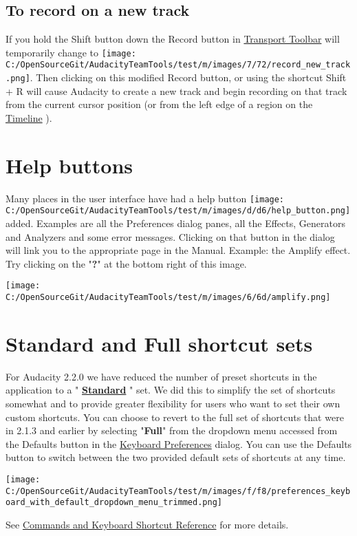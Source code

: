 \begin{multicols}{2}
\subsection{To record on a new track}If you hold the Shift button down the Record button in 
\hyperref[XXX\foo{transport_toolbar_}]{Transport Toolbar}
 will temporarily change to \texttt{[image: C:/OpenSourceGit/AudacityTeamTools/test/m/images/7/72/record\_new\_track.png]}. Then clicking on this modified Record button, or using the shortcut Shift + R will cause Audacity to create a new track and begin recording on that track from the current cursor position (or from the left edge of a region on the 
\hyperref[XXX\foo{timeline_}]{Timeline}
). 

\section{Help buttons}Many places in the user interface have had a help button \texttt{[image: C:/OpenSourceGit/AudacityTeamTools/test/m/images/d/d6/help\_button.png]} added. Examples are all the Preferences dialog panes, all the Effects, Generators and Analyzers and some error messages.
Clicking on that button in the dialog will link you to the appropriate page in the Manual.
Example: the Amplify effect.  Try clicking on the "\textbf{?}" at the bottom right of this image.
\par \texttt{[image: C:/OpenSourceGit/AudacityTeamTools/test/m/images/6/6d/amplify.png]}\par 
\section{Standard and Full shortcut sets}For Audacity 2.2.0 we have reduced the number of preset shortcuts in the application to a "\textbf{
\hyperref[XXX\foo{keyboard_shortcut_reference_}]{Standard}
}" set.  We did this to simplify the set of shortcuts somewhat and to provide greater flexibility for users who want to set their own custom shortcuts.
You can choose to revert to the full set of shortcuts that were in 2.1.3 and earlier by selecting "\textbf{Full}" from the dropdown menu accessed from the Defaults button in the 
\hyperref[XXX\foo{keyboard_preferences_}]{Keyboard Preferences}
 dialog.
You can use the Defaults button to switch between the two provided default sets of shortcuts at any time.
\par \texttt{[image: C:/OpenSourceGit/AudacityTeamTools/test/m/images/f/f8/preferences\_keyboard\_with\_default\_dropdown\_menu\_trimmed.png]}\par See 
\hyperref[XXX\foo{keyboard_shortcut_reference_}]{Commands and Keyboard Shortcut Reference}
 for more details.


\end{multicols}
